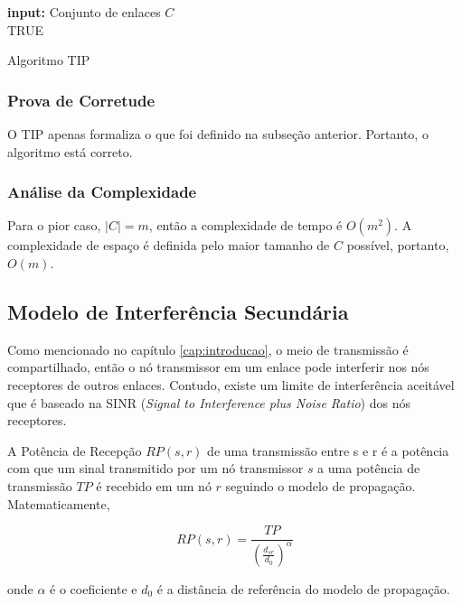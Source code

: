 \begin{algorithm}[h]
	\SetVline
	{\bf input:} Conjunto de enlaces $C$\\
	\Return TRUE
\caption{Algoritmo TIP}
\label{alg:tip}
\end{algorithm}

\subsubsection{Prova de Corretude}

O TIP apenas formaliza o que foi definido na subseção anterior. Portanto, o algoritmo está correto. 

\subsubsection{Análise da Complexidade}

Para o pior caso, $|C|=m$, então a complexidade de tempo é $O(m^2)$. A complexidade de espaço é definida pelo maior tamanho de $C$ possível, portanto, $O(m)$.

\subsection{Modelo de Interferência Secundária}

Como mencionado no capítulo \ref{cap:introducao}, o meio de transmissão é compartilhado, então o nó transmissor em um enlace pode interferir nos nós receptores de outros enlaces. Contudo, existe um limite de interferência aceitável que é baseado na SINR ({\it Signal to Interference plus Noise Ratio})   dos nós receptores.

A Potência de Recepção $RP(s,r)$ de uma transmissão entre s e r é a potência com que um sinal transmitido por um nó transmissor $s$ a uma potência de transmissão $TP$ é recebido em um nó $r$ seguindo o modelo de propagação. Matematicamente,

\begin{equation}
RP(s,r) = \frac{TP}{(\frac{d_{sr}}{d_{0}})^{\alpha}}
\label{eq:rp}
\end{equation}

onde $\alpha$ é o coeficiente e $d_{0}$ é a distância de referência do modelo de propagação.

